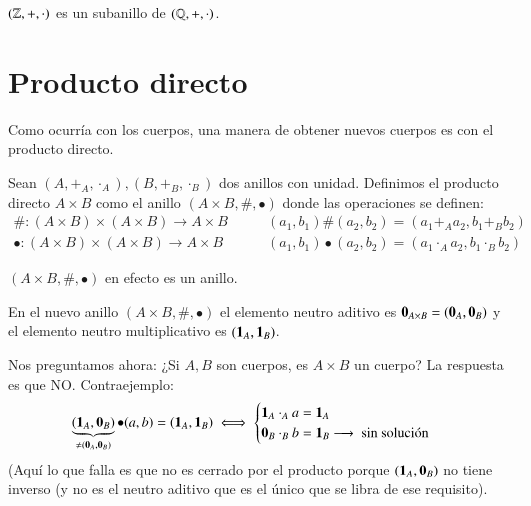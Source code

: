 \begin{ej}
	$(\mathbb{Z}, +, \cdot)$ es un subanillo de $(\mathbb{Q}, +, \cdot)$.
\end{ej}

\section{Producto directo}

Como ocurría con los cuerpos, una manera de obtener nuevos cuerpos es con el producto directo.

\begin{dfn}
	Sean $(A, +_A, \cdot_A), (B, +_B, \cdot_B)$ dos anillos con unidad. Definimos el producto directo $A \times B$ como el anillo $(A \times B, \#, \bullet)$ donde las operaciones se definen:
	\begin{align*}
	\# : (A\times B) \times (A\times B) \to A \times B\qquad &(a_1, b_1) \# (a_2, b_2) = (a_1 +_A a_2, b_1 +_B b_2) \\
	\bullet : (A\times B) \times (A\times B) \to A \times B\qquad &(a_1, b_1) \bullet (a_2, b_2) = (a_1 \cdot_A a_2, b_1 \cdot_B b_2)
	\end{align*}
\end{dfn}

\begin{pro}
	$(A\times B, \#, \bullet)$ en efecto es un anillo.
\end{pro}

\begin{obs}
	En el nuevo anillo $(A\times B, \#, \bullet)$ el elemento neutro aditivo es $\mathbf{0}_{A\times B} = (\mathbf{0}_A, \mathbf{0}_B)$ y el elemento neutro multiplicativo es $(\mathbf{1}_A, \mathbf{1}_B)$.
\end{obs}

\begin{obs}
	Nos preguntamos ahora: ¿Si $A, B$ son cuerpos, es $A \times B$ un cuerpo? La respuesta es que NO. Contraejemplo:
	\begin{align*}
	\underbrace{(\mathbf{1}_A,\mathbf{0}_B)}_{\neq (\mathbf{0}_A, \mathbf{0}_B)} \bullet (a,b) = (\mathbf{1}_A, \mathbf{1}_B) \iff \begin{cases}
	\mathbf{1}_A \cdot_A a = \mathbf{1}_A \\
	\mathbf{0}_B \cdot_B b = \mathbf{1}_B \longrightarrow\text{ sin solución }
	\end{cases}
	\end{align*}
	(Aquí lo que falla es que no es cerrado por el producto porque $(\mathbf{1}_A, \mathbf{0}_B)$ no tiene inverso (y no es el neutro aditivo que es el único que se libra de ese requisito).
\end{obs}

